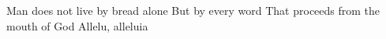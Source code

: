 \endverse                         

\beginverse                       
\chordsoff  								

Man does not live by bread alone
But by every word
That proceeds from the mouth of God
Allelu, alleluia

\endverse                         



\endsong
